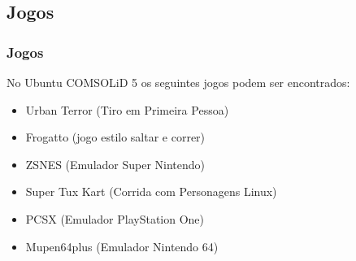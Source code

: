 \subsection{Jogos}

\begin{frame}


\end{frame}

\begin{frame}\frametitle{Jogos}

No Ubuntu COMSOLiD 5 os seguintes jogos podem ser encontrados:
\begin{itemize}
	\item Urban Terror (Tiro em Primeira Pessoa)
	\item Frogatto (jogo estilo saltar e correr)
	\item ZSNES (Emulador Super Nintendo)
	\item Super Tux Kart (Corrida com Personagens Linux)
	\item PCSX (Emulador PlayStation One)
	\item Mupen64plus (Emulador Nintendo 64)
\end{itemize}

\end{frame}

